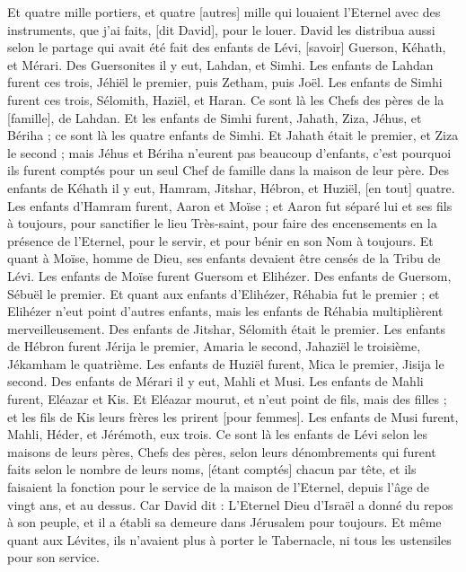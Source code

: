 \begin{multicols}{2}
Et quatre mille portiers, et quatre [autres] mille qui louaient l'Eternel avec des instruments, que j'ai faits, [dit David], pour le louer.
David les distribua aussi selon le partage qui avait été fait des enfants de Lévi, [savoir] Guerson, Kéhath, et Mérari.
Des Guersonites il y eut, Lahdan, et Simhi.
Les enfants de Lahdan furent ces trois, Jéhiël le premier, puis Zetham, puis Joël.
Les enfants de Simhi furent ces trois, Sélomith, Haziël, et Haran. Ce sont là les Chefs des pères de la [famille], de Lahdan.
Et les enfants de Simhi furent, Jahath, Ziza, Jéhus, et Bériha ; ce sont là les quatre enfants de Simhi.
Et Jahath était le premier, et Ziza le second ; mais Jéhus et Bériha n'eurent pas beaucoup d'enfants, c'est pourquoi ils furent comptés pour un seul Chef de famille dans la maison de leur père.
Des enfants de Kéhath il y eut, Hamram, Jitshar, Hébron, et Huziël, [en tout] quatre.
Les enfants d'Hamram furent, Aaron et Moïse ; et Aaron fut séparé lui et ses fils à toujours, pour sanctifier le lieu Très-saint, pour faire des encensements en la présence de l'Eternel, pour le servir, et pour bénir en son Nom à toujours.
Et quant à Moïse, homme de Dieu, ses enfants devaient être censés de la Tribu de Lévi.
Les enfants de Moïse furent Guersom et Elihézer.
Des enfants de Guersom, Sébuël le premier.
Et quant aux enfants d'Elihézer, Réhabia fut le premier ; et Elihézer n'eut point d'autres enfants, mais les enfants de Réhabia multiplièrent merveilleusement.
Des enfants de Jitshar, Sélomith était le premier.
Les enfants de Hébron furent Jérija le premier, Amaria le second, Jahaziël le troisième, Jékamham le quatrième.
Les enfants de Huziël furent, Mica le premier, Jisija le second.
Des enfants de Mérari il y eut, Mahli et Musi. Les enfants de Mahli furent, Eléazar et Kis.
Et Eléazar mourut, et n'eut point de fils, mais des filles ; et les fils de Kis leurs frères les prirent [pour femmes].
Les enfants de Musi furent, Mahli, Héder, et Jérémoth, eux trois.
Ce sont là les enfants de Lévi selon les maisons de leurs pères, Chefs des pères, selon leurs dénombrements qui furent faits selon le nombre de leurs noms, [étant comptés] chacun par tête, et ils faisaient la fonction pour le service de la maison de l'Eternel, depuis l'âge de vingt ans, et au dessus.
Car David dit : L'Eternel Dieu d'Israël a donné du repos à son peuple, et il a établi sa demeure dans Jérusalem pour toujours.
Et même quant aux Lévites, ils n'avaient plus à porter le Tabernacle, ni tous les ustensiles pour son service.

\end{multicols}
